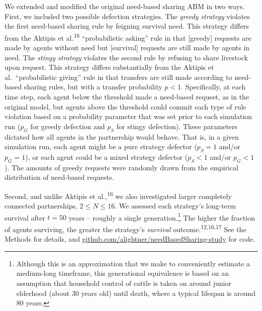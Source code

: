 \documentclass[
]{article}
\begin{document}
We extended and modified the original need-based sharing ABM in two ways. First, we included two possible defection strategies. The \emph{greedy strategy} violates the first need-based sharing rule by feigning survival need. This strategy differs from the Aktipis et al.\textsuperscript{16} ``probabilistic asking'' rule in that {[}greedy{]} requests are made by agents without need but {[}survival{]} requests are still made by agents in need. The \emph{stingy strategy} violates the second rule by refusing to share livestock upon request. This strategy differs substantially from the Aktipis et al.~``probabilistic giving'' rule in that transfers are still made according to need-based sharing rules, but with a transfer probability \(p<1\). Specifically, at each time step, each agent below the threshold made a need-based request, as in the original model, but agents above the threshold could commit each type of rule violation based on a probability parameter that was set prior to each simulation run (\(p_G\) for greedy defection and \(p_S\) for stingy defection). These parameters dictated how all agents in the partnership would behave. That is, in a given simulation run, each agent might be a pure strategy defector (\(p_S=1\) and/or \(p_G=1\)), or each agent could be a mixed strategy defector (\(p_S<1\) and/or \(p_G<1\)). The amounts of greedy requests were randomly drawn from the empirical distribution of need-based requests.

Second, and unlike Aktipis et al.,\textsuperscript{16} we also investigated larger completely connected partnerships, \(2 \le N \le 16\). We assessed each strategy's long-term survival after \(t=50\) years -- roughly a single generation.\footnote{Although this is an approximation that we make to conveniently estimate a medium-long timeframe, this generational equivalence is based on an assumption that household control of cattle is taken on around junior elderhood (about 30 years old) until death, where a typical lifespan is around 80 years.} The higher the fraction of agents surviving, the greater the strategy's \emph{survival} outcome.\textsuperscript{12,16,17} See the Methods for details, and \href{https://github.com/alightner/needBasedSharing-study}{github.com/alightner/needBasedSharing-study} for code.
\end{document}
